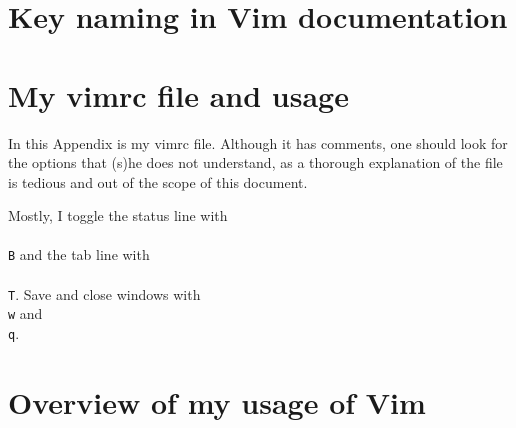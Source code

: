 \documentclass{article}
\begin{document}
\section{Key naming in Vim documentation}
\section{My vimrc file and usage}
In this Appendix is my vimrc file.
Although it has comments, one should
look for the options that (s)he does
not understand, as a thorough explanation
of the file is tedious and out of the scope
of this document.

Mostly, I toggle the status line with \texttt{\\\\B}
and the tab line with \texttt{\\\\T}.
Save and close windows with \texttt{\\w} and \texttt{\\q}.


\section{Overview of my usage of Vim}
\end{document}
